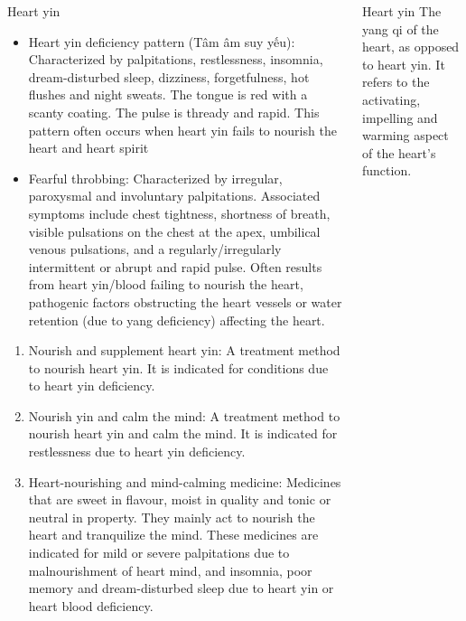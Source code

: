 \documentclass[
	11pt, %
]{beamer}
\theoremstyle{newblock}
\begin{document}
\begin{frame}
\begin{columns}[T]
{\begin{block}{Heart yin}
			\begin{itemize}
				\item Heart yin deficiency pattern (Tâm âm suy yếu): Characterized by palpitations, restlessness, insomnia, dream-disturbed sleep, dizziness, forgetfulness, hot flushes and night sweats. The tongue is red with a scanty coating. The pulse is thready and rapid. This pattern often occurs when heart yin fails to nourish the heart and heart spirit
				\item  Fearful throbbing: Characterized by irregular, paroxysmal and involuntary palpitations. Associated symptoms include chest tightness, shortness of breath, visible pulsations on the chest at the apex, umbilical venous pulsations, and a regularly/irregularly intermittent or abrupt and rapid pulse. Often results from heart yin/blood failing to nourish the heart, pathogenic factors obstructing the heart vessels or water retention (due to yang deficiency) affecting the heart.
			\end{itemize}
			\begin{enumerate}
				\item Nourish and supplement heart yin: A treatment method to nourish heart yin. It is indicated for conditions due to heart yin deficiency.
				\item Nourish yin and calm the mind: A treatment method to nourish heart yin and calm the mind. It is indicated for restlessness due to heart yin deficiency.
				\item Heart-nourishing and mind-calming medicine: Medicines that are sweet in flavour, moist in quality and tonic or neutral in property. They mainly act to nourish the heart and tranquilize the mind. These medicines are indicated for mild or severe palpitations due to malnourishment of heart mind, and insomnia, poor memory and dream-disturbed sleep due to heart yin or heart blood deficiency.
			\end{enumerate}
		\end{block}
		\begin{block}{Heart yin}
			The yang qi of the heart, as opposed to heart yin. It refers to the activating, impelling and warming aspect of the heart's function.\\
			
		\end{block}
		}
	\end{columns}
\end{frame}
\end{document}
